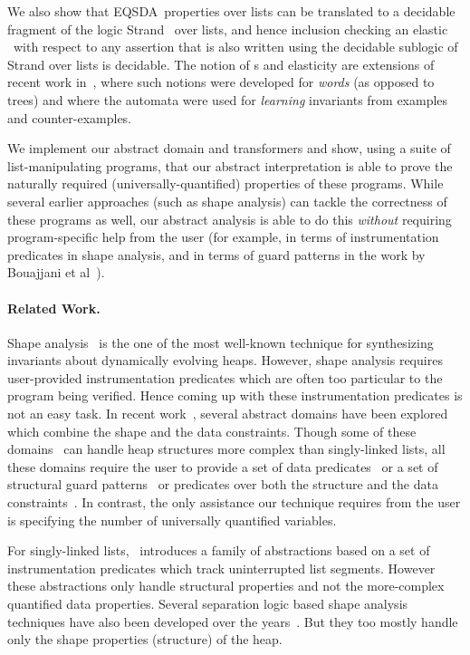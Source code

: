 \documentclass{llncs}
\newcommand{\EQSDA}{\mbox{\sc EQSDA}}
\begin{document}
We also show that \EQSDA\ properties over lists can be translated to a decidable fragment of the logic {\sc Strand}~\cite{popl11} over lists, and hence
inclusion checking an elastic \QSDA\ with respect to any assertion that is also written using the decidable
sublogic of {\sc Strand} over lists is decidable. The notion of \QSDA s and elasticity are extensions
of recent work in~\cite{CAVQDA}, where such notions were developed for \emph{words}
(as opposed to trees) and where the automata were used for \emph{learning} invariants from examples and counter-examples.



We implement our abstract domain and transformers and show, using a suite of list-manipulating programs,
that our abstract interpretation is able to prove the naturally required (universally-quantified) properties of these programs.
While
several earlier approaches (such as shape analysis) can tackle the correctness of these programs as well, our abstract
analysis is able to do this \emph{without} requiring program-specific help from the user (for example, in terms of
instrumentation predicates in shape analysis, and in terms of guard patterns in the work by Bouajjani et al~\cite{celia}).

\paragraph{\bf Related Work.}

Shape analysis~\cite{shapeanalysis} is the one of the most well-known technique for synthesizing invariants about dynamically evolving heaps. However, shape analysis requires user-provided instrumentation predicates which are often too particular to the program being verified. Hence coming up with these instrumentation predicates is not an easy task.
In recent work~\cite{sas10,chang-rival,celia,gulwani08}, several abstract domains have been explored which combine the shape and the data constraints.
Though some of these domains~\cite{sas10,chang-rival} can handle heap structures more complex than singly-linked lists, all these domains require the user to provide a set of data predicates~\cite{gulwani08} or a set of structural guard patterns~\cite{celia} or predicates over both the structure and the data constraints~\cite{sas10,chang-rival}.
In contrast, the only assistance our technique requires from the user is specifying the number of universally quantified variables.

For singly-linked lists,~\cite{rama} introduces a family of abstractions based on a set of instrumentation predicates which track uninterrupted list segments. However these abstractions only handle structural properties and not the more-complex quantified data properties.
Several separation logic based shape analysis techniques have also been developed over the years~\cite{distefano,guo,berdine,slayer}. But they too mostly handle only the shape properties (structure) of the heap.
\end{document}
